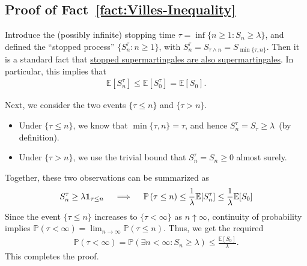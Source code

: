 \documentclass[12pt]{article}
\begin{document}
\newpage
\begin{appendix}
    \section{Proof of Fact~\ref{fact:Villes-Inequality}}
    Introduce the (possibly infinite) stopping time $\tau = \inf \{n \geq 1: S_n \geq \lambda\}$, and defined the ``stopped process'' $\{S^\tau_n: n \geq 1\}$, with $S^{\tau}_n = S_{\tau \wedge n} = S_{\min\{\tau, n\}}$. Then it is a standard fact that \href{https://proofwiki.org/wiki/Stopped_Supermartingale_is_Supermartingale}{stopped supermartingales are also supermartingales}. In particular, this implies that 
    \begin{align}
        \mathbb{E}[S^\tau_n] \leq \mathbb{E}[S^{\tau}_0] = \mathbb{E}[S_0]. 
    \end{align}

    Next, we consider the two events $\{\tau \leq n\}$ and $\{\tau > n\}$. 
    \begin{itemize}
        \item Under $\{\tau \leq n\}$, we know that $\min\{\tau, n\} = \tau$, and hence $S^\tau_n = S_\tau \geq \lambda$~(by definition).
        \item Under $\{\tau > n\}$, we use the trivial bound that $S^\tau_n = S_n \geq 0$ almost surely. 
    \end{itemize}
    Together, these two observations can be summarized as 
    \begin{align}
        S^{\tau}_n \geq \lambda \boldsymbol{1}_{\tau \leq n} \quad \implies \quad 
        \mathbb{P}\left( \tau \leq n \right) \leq \frac{1}{\lambda} \mathbb{E}[S^\tau_n ] \leq \frac{1}{\lambda} \mathbb{E}[S_0]
    \end{align}
    Since the event $\{\tau \leq n\}$ increases to $\{\tau < \infty\}$ as $n \uparrow \infty$, continuity of probability implies $\mathbb{P}(\tau < \infty) = \lim_{n \to \infty} \mathbb{P}(\tau \leq n)$. Thus, we get the required 
    \begin{align}
        \mathbb{P}(\tau < \infty) = \mathbb{P}(\exists n < \infty: S_n \geq \lambda) \leq \frac{\mathbb{E}[S_0]}{\lambda}. 
    \end{align}
    This completes the proof. \hfill \qedsymbol
\end{appendix}

\end{document}
